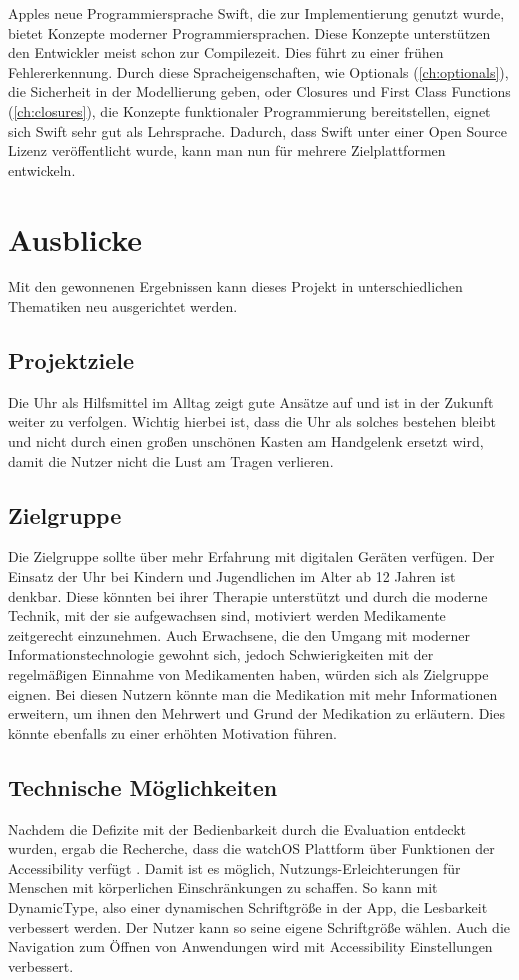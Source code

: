 Apples neue Programmiersprache Swift, die zur Implementierung genutzt wurde, bietet Konzepte moderner Programmiersprachen. Diese Konzepte unterstützen den Entwickler meist schon zur Compilezeit. Dies führt zu einer frühen Fehlererkennung. Durch diese Spracheigenschaften, wie Optionals (\ref{ch:optionals}), die Sicherheit in der Modellierung geben, oder Closures und First Class Functions (\ref{ch:closures}), die Konzepte funktionaler Programmierung bereitstellen, eignet sich Swift sehr gut als Lehrsprache. Dadurch, dass Swift unter einer Open Source Lizenz veröffentlicht wurde, kann man nun für mehrere Zielplattformen entwickeln.

\section{Ausblicke}
Mit den gewonnenen Ergebnissen kann dieses Projekt in unterschiedlichen Thematiken neu ausgerichtet werden. 
\subsection*{Projektziele}
Die Uhr als Hilfsmittel im Alltag zeigt gute Ansätze auf und ist in der Zukunft weiter zu verfolgen. Wichtig hierbei ist, dass die Uhr als solches bestehen bleibt und nicht durch einen großen unschönen Kasten am Handgelenk ersetzt wird, damit die Nutzer nicht die Lust am Tragen verlieren.

\subsection*{Zielgruppe}
Die Zielgruppe sollte über mehr Erfahrung mit digitalen Geräten verfügen. Der Einsatz der Uhr bei Kindern und Jugendlichen im Alter ab 12 Jahren ist denkbar. Diese könnten bei ihrer Therapie unterstützt und durch die moderne Technik, mit der sie aufgewachsen sind, motiviert werden Medikamente zeitgerecht einzunehmen. Auch Erwachsene, die den Umgang mit moderner Informationstechnologie gewohnt sich, jedoch Schwierigkeiten mit der regelmäßigen Einnahme von Medikamenten haben, würden sich als Zielgruppe eignen. Bei diesen Nutzern könnte man die Medikation mit mehr Informationen erweitern, um ihnen den Mehrwert und Grund der Medikation zu erläutern. Dies könnte ebenfalls zu einer erhöhten Motivation führen.

\subsection*{Technische Möglichkeiten}
Nachdem die Defizite mit der Bedienbarkeit durch die Evaluation entdeckt wurden, ergab die Recherche, dass die watchOS Plattform über Funktionen der Accessibility verfügt \cite{Apple:watchAccess}. Damit ist es möglich, Nutzungs-Erleichterungen für Menschen mit körperlichen Einschränkungen zu schaffen. So kann mit DynamicType, also einer dynamischen Schriftgröße in der App, die Lesbarkeit verbessert werden. Der Nutzer kann so seine eigene Schriftgröße wählen. Auch die Navigation zum Öffnen von Anwendungen wird mit Accessibility Einstellungen verbessert.

